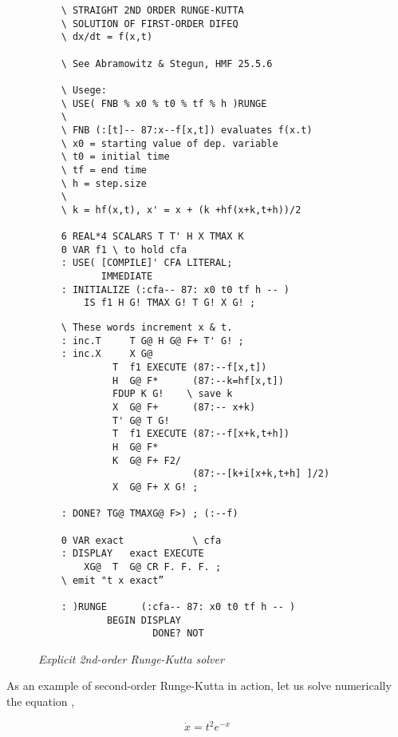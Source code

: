 \begin{figure}
    \tiny
    \begin{tcolorbox} [sidebyside, colback=white, sharp corners, enhanced, segmentation style=solid]
    \begin{lstlisting}
    \ STRAIGHT 2ND ORDER RUNGE-KUTTA
    \ SOLUTION OF FIRST-ORDER DIFEQ
    \ dx/dt = f(x,t)

    \ See Abramowitz & Stegun, HMF 25.5.6

    \ Usege:
    \ USE( FNB % x0 % t0 % tf % h )RUNGE
    \
    \ FNB (:[t]-- 87:x--f[x,t]) evaluates f(x.t)
    \ x0 = starting value of dep. variable
    \ t0 = initial time
    \ tf = end time
    \ h = step.size
    \
    \ k = hf(x,t), x' = x + (k +hf(x+k,t+h))/2

    6 REAL*4 SCALARS T T' H X TMAX K
    0 VAR f1 \ to hold cfa
    : USE( [COMPILE]' CFA LITERAL;
           IMMEDIATE
    : INITIALIZE (:cfa-- 87: x0 t0 tf h -- )
        IS f1 H G! TMAX G! T G! X G! ;
    \end{lstlisting}
\tcblower
    \begin{lstlisting}
    \ These words increment x & t.
    : inc.T     T G@ H G@ F+ T' G! ;
    : inc.X     X G@
             T  f1 EXECUTE (87:--f[x,t])
             H  G@ F*      (87:--k=hf[x,t])
             FDUP K G!    \ save k
             X  G@ F+      (87:-- x+k)
             T' G@ T G!
             T  f1 EXECUTE (87:--f[x+k,t+h])
             H  G@ F*
             K  G@ F+ F2/
                           (87:--[k+i[x+k,t+h] ]/2)
             X  G@ F+ X G! ;

    : DONE? TG@ TMAXG@ F>) ; (:--f)

    0 VAR exact            \ cfa
    : DISPLAY   exact EXECUTE
        XG@  T  G@ CR F. F. F. ;
    \ emit "t x exact”

    : )RUNGE      (:cfa-- 87: x0 t0 tf h -- )
            BEGIN DISPLAY
                    DONE? NOT
    \end{lstlisting}
    \end{tcolorbox}
    \caption{\textit{Explicit 2nd-order Runge-Kutta solver}}
    \label{fig:06_07}
\end{figure}

As an example of second-order Runge-Kutta in action, let us solve numerically the equation ,

\begin{equation}
    \dot{x} = t^2 e^{-x}
    \label{eq:06_21} 
\end{equation}

